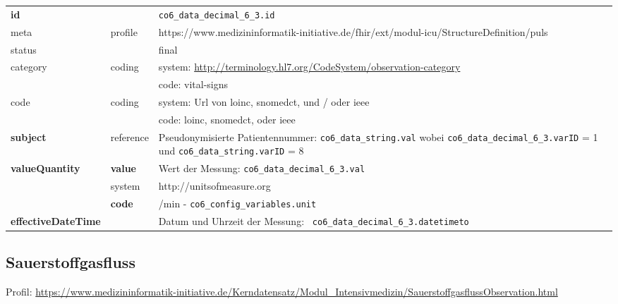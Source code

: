 \begin{longtable}{|l|l|p{7.5cm}|}
	\hline
	\rowcolor{lightgray} \multicolumn{3}{|l|}{Data Mapping (inhaltlich)} \\ \hline
	\textbf{id} &  & \texttt{co6\_data\_decimal\_6\_3.id} \\ \hline
	meta & profile & https://www.medizininformatik-initiative.de/fhir/ext/modul-icu/StructureDefinition/puls \\ \hline 
	status &  & final   \\ \hline 
	category & coding & system: \url{http://terminology.hl7.org/CodeSystem/observation-category} \\
	\cline{3-3}
	& & code: vital-signs\\ \hline
	code & coding & system: Url von \ac{loinc}, \ac{snomedct}, und / oder \ac{ieee} \\ 
	\cline{3-3} 
	&  & code: \ac{loinc}, \ac{snomedct}, oder \ac{ieee} \\ \hline
	\textbf{subject} & reference & Pseudonymisierte Patientennummer: \texttt{co6\_data\_string.val} wobei \texttt{co6\_data\_decimal\_6\_3.varID} = 1 und \texttt{co6\_data\_string.varID} = 8 \\ \hline
	\textbf{valueQuantity}  & \textbf{value} & Wert der Messung: \texttt{co6\_data\_decimal\_6\_3.val} \\
	\cline{2-3}
	& system & http://unitsofmeasure.org \\
	\cline{2-3}
	& \textbf{code} & /min - \texttt{co6\_config\_variables.unit} \\ \hline
	\textbf{effectiveDateTime}  & & Datum und Uhrzeit der Messung: \texttt{
		co6\_data\_decimal\_6\_3.datetimeto} \\
	\hline
\end{longtable}

\subsection{Sauerstoffgasfluss} 
Profil: \url{https://www.medizininformatik-initiative.de/Kerndatensatz/Modul_Intensivmedizin/SauerstoffgasflussObservation.html}


